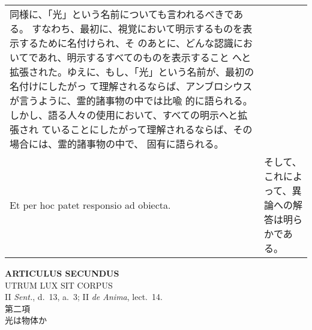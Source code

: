 \documentclass[10pt]{jsarticle} %
\begin{document}
\begin{longtable}{p{21em}p{21em}}
同様に、「光」という名前についても言われるべきである。
すなわち、最初に、視覚において明示するものを表示するために名付けられ、そ
 のあとに、どんな認識においてであれ、明示するすべてのものを表示すること
 へと拡張された。ゆえに、もし、「光」という名前が、最初の名付けにしたがっ
 て理解されるならば、アンブロシウスが言うように、霊的諸事物の中では比喩
 的に語られる。しかし、語る人々の使用において、すべての明示へと拡張され
 ていることにしたがって理解されるならば、その場合には、霊的諸事物の中で、
 固有に語られる。


\\


\noindent
Et per hoc patet responsio ad obiecta.

&

そして、これによって、異論への解答は明らかである。



\end{longtable}
\newpage





\begin{center}
 {\Large {\bf ARTICULUS SECUNDUS}}\\
 {\large UTRUM LUX SIT CORPUS}\\
 {\footnotesize II {\itshape Sent.}, d.~13, a.~3; II {\itshape de
 Anima}, lect.~14.}\\
 {\Large 第二項\\光は物体か}
\end{center}
\end{document}
